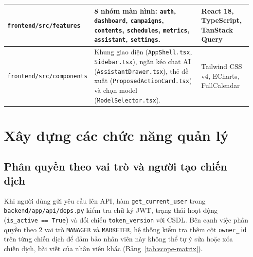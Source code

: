 \begin{table}[!htbp]
\begin{tabularx}{\textwidth}{|L{4.2cm}|Y|L{3.1cm}|}
\hline
\texttt{frontend/src/features} & 8 nhóm màn hình: \texttt{auth}, \texttt{dashboard}, \texttt{campaigns}, \texttt{contents}, \texttt{schedules}, \texttt{metrics}, \texttt{assistant}, \texttt{settings}. & React 18, TypeScript, TanStack Query\\
\hline
\texttt{frontend/src/components} & Khung giao diện (\texttt{AppShell.tsx}, \texttt{Sidebar.tsx}), ngăn kéo chat AI (\texttt{AssistantDrawer.tsx}), thẻ đề xuất (\texttt{ProposedActionCard.tsx}) và chọn model (\texttt{ModelSelector.tsx}). & Tailwind CSS v4, ECharts, FullCalendar\\
\hline
\end{tabularx}
\end{table}

\section{Xây dựng các chức năng quản lý}

\subsection{Phân quyền theo vai trò và người tạo chiến dịch}

Khi người dùng gửi yêu cầu lên API, hàm \texttt{get\_current\_user} trong \texttt{backend/app/api/deps.py} kiểm tra chữ ký JWT, trạng thái hoạt động (\texttt{is\_active == True}) và đối chiếu \texttt{token\_version} với CSDL. Bên cạnh việc phân quyền theo 2 vai trò \texttt{MANAGER} và \texttt{MARKETER}, hệ thống kiểm tra thêm cột \texttt{owner\_id} trên từng chiến dịch để đảm bảo nhân viên này không thể tự ý sửa hoặc xóa chiến dịch, bài viết của nhân viên khác (Bảng~\ref{tab:scope-matrix}).

